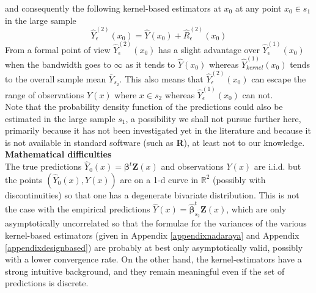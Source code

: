 \documentclass[a4paper,12pt,leqno, titlepage]{article}
\newcommand{\R}{\mathbb{R}}
\begin{document}
 and consequently the following kernel-based estimators at $x_0$ at any point $x_0\in{s_1}$ in the large sample
 \begin{equation}\label{Yepsilonstar}
 \hat{Y}^{(2)}_{\epsilon}(x_0)= \hat{Y}(x_0)+ \hat{R}^{(2)}_{\epsilon}(x_0)
 \end{equation}
From a formal point of view $\hat{Y}_{\epsilon}^{(2)}(x_0)$ has a slight advantage over $\hat{Y}_{\epsilon}^{(1)}(x_0)$ when the bandwidth goes to $\infty$ as it tends to $\hat{Y}(x_0)$ whereas
$\hat{Y}_{kernel}^{(1)}(x_0)$ tends to the overall sample mean $\bar{Y}_{s_2}$. This also means that
$\hat{Y}_{\epsilon}^{(2)}(x_0)$ can escape the range of observations $Y(x)$ where $x\in{s_2}$ whereas $\hat{Y}_{\epsilon}^{(1)}(x_0)$  can not.\\
 Note that the probability density function of the predictions could also be estimated in the large sample $s_1$, a possibility we shall not pursue further here, primarily because it has not been investigated yet in the literature and because it is not available in standard software (such as \textbf{R}), at least not to our knowledge.\\

 \noindent \textbf{Mathematical difficulties}\\
The true predictions $\hat{Y}_0(x)=\pmb{\beta}^t\pmb{Z}(x)$ and observations $Y(x)$ are i.i.d.  but the points $(\hat{Y}_0(x),Y(x))$ are on a 1-d curve in $\R^2$ (possibly with discontinuities) so that one has a degenerate bivariate distribution. This is not the case with the empirical predictions $\hat{Y}(x)=\hat{\pmb{\beta}}_{s_2}^t\pmb{Z}(x)$, which are only asymptotically uncorrelated so that the formulae for the variances of the various kernel-based estimators (given in Appendix \ref{appendixnadaraya} and Appendix \ref{appendixdesignbased}) are probably at best only asymptotically valid, possibly  with a lower convergence rate. On the other hand, the kernel-estimators have a strong intuitive background, and they remain meaningful even if the set of predictions is discrete.\\
\end{document}
